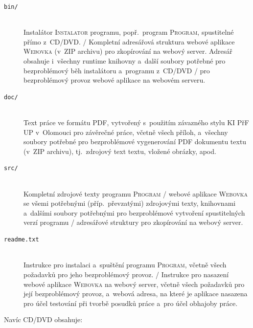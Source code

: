 \documentclass[
  biblatex,
  glossaries,
  index
]{kidiplom}
\begin{document}
\begin{description}

  \item[\texttt{bin/}] \hfill \\
        Instalátor \textsc{Instalator} programu, popř.~program
        \textsc{Program}, spustitelné přímo z~CD/DVD. / Kompletní adresářová
        struktura webové aplikace \textsc{Webovka} (v~ZIP archivu) pro
        zkopírování na webový server. Adresář obsahuje i~všechny runtime
        knihovny a~další soubory potřebné pro bezproblémový běh instalátoru
        a~programu z~CD/DVD / pro bezproblémový provoz webové aplikace na
        webovém serveru.

  \item[\texttt{doc/}] \hfill \\
        Text práce ve formátu PDF, vytvořený s~použitím závazného stylu KI
        PřF UP v~Olomouci pro závěrečné práce, včetně všech příloh,
        a~všechny soubory potřebné pro bezproblémové vygenerování PDF
        dokumentu textu (v~ZIP archivu), tj.~zdrojový text textu, vložené
        obrázky, apod.

  \item[\texttt{src/}] \hfill \\
        Kompletní zdrojové texty programu \textsc{Program} / webové aplikace
        \textsc{Webovka} se všemi potřebnými (příp.~převzatými) zdrojovými
        texty, knihovnami a~dalšími soubory potřebnými pro bezproblémové
        vytvoření spustitelných verzí programu / adresářové struktury pro
        zkopírování na webový server.

  \item[\texttt{readme.txt}] \hfill \\
        Instrukce pro instalaci a~spuštění programu \textsc{Program}, včetně
        všech požadavků pro jeho bezproblémový provoz. / Instrukce pro
        nasazení webové aplikace \textsc{Webovka} na webový server, včetně
        všech požadavků pro její bezproblémový provoz, a~webová adresa, na
        které je aplikace nasazena pro účel testování při tvorbě posudků
        práce a~pro účel obhajoby práce.

\end{description}

Navíc CD/DVD obsahuje:
\end{document}

